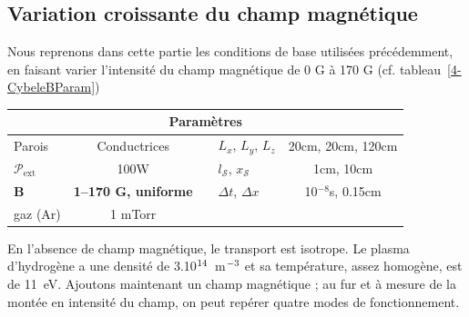 \begin{refsection}
\subsection{Variation croissante du champ magnétique}
Nous reprenons dans cette partie les conditions de base utilisées précédemment,
en faisant varier l'intensité du champ magnétique de 0 G à 170 G (cf.
tableau~\ref{4-CybeleBParam})

\begin{minipage}{\textwidth}
\footnotesize\centering
{}
\begin{tabular}{lcclc}\toprule
\multicolumn{5}{c}{\bf Paramètres}\\
\midrule 
Parois & Conductrices &&$L_x$, $L_y$, $L_z$  & 20cm, 20cm,
120cm\\
$\mathcal{P}_\text{ext}$&100W&&$l_\mathcal{S}$, $x_\mathcal{S}$&1cm, 10cm\\
$\mathbf B$ &\textbf{1--170 G, uniforme}&&$\Delta t$, $\Delta x$&10$^{-8}$s,
0.15cm\\
gaz (Ar) & 1 mTorr&&&\\
\bottomrule
\end{tabular}
\label{4-CybeleBParam}
\end{minipage}	

En l'absence de champ magnétique, le transport est isotrope. Le plasma
d'hydrogène a une densité de 3.10$^{{14}}$~m$^{{-3}}$ et sa
température, assez homogène, est de 11~eV. Ajoutons maintenant un champ
magnétique ; au fur et à mesure de la montée en intensité du champ, on peut
repérer quatre modes de fonctionnement.


\end{refsection}
